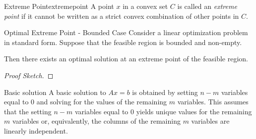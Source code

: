 \documentclass[letter,12pt]{book}
\renewcommand{\0}{\mathbf{0}}
\begin{document}
\begin{definition}{Extreme Point}{extremepoint}
A point $x$ in a convex set $C$ is called an \emph{extreme point} if it cannot be written as a strict convex combination of other points in $C$.
\end{definition}

\begin{theorem}{Optimal Extreme Point - Bounded Case}{}
Consider a linear optimization problem in standard form.  Suppose that the feasible region is bounded and non-empty. 

Then there exists an optimal solution at an extreme point of the feasible region.
\end{theorem}

\begin{proof}[Proof Sketch]

\end{proof}


\begin{definition}{Basic solution}{}
A basic solution to $Ax = b$ is obtained by setting $n-m$ variables equal to $0$ and solving for the values of the remaining $m$ variables.  This assumes that the setting $n-m$ variables equal to 0 yields unique values for the remaining $m$ variables or, equivalently, the columns of the remaining $m$ variables are linearly independent.
\end{definition}
\end{document}
